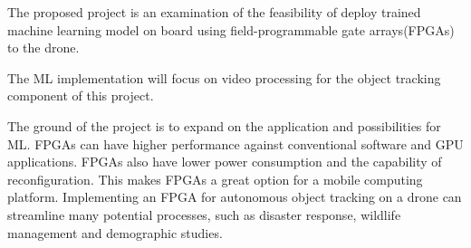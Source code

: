 The proposed project is an examination of the feasibility of  deploy trained machine learning model on board using field-programmable gate arrays(FPGAs) to the drone.

The ML implementation will focus on video processing for the object tracking component of this project.

The ground of the project is to expand on the application and possibilities for ML. FPGAs can have higher performance against conventional software and GPU applications. FPGAs also have lower power consumption and the capability of reconfiguration. This makes FPGAs a great option for a mobile computing platform. Implementing an FPGA for autonomous object tracking on a drone can streamline many potential processes, such as disaster response, wildlife management and demographic studies.